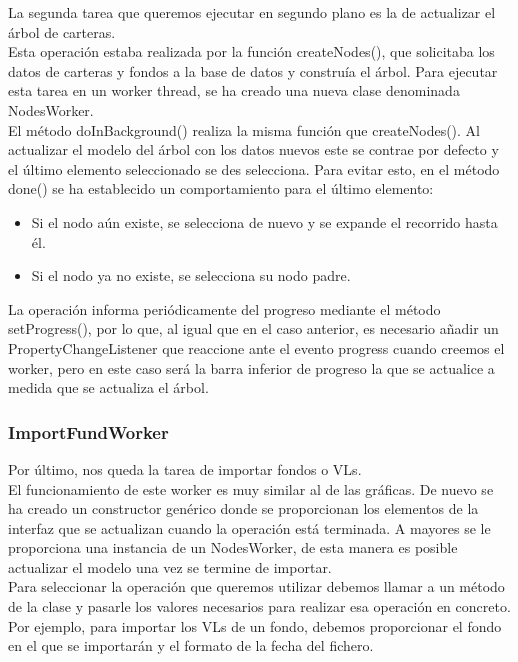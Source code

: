 \documentclass[12pt, a4paper]{article}
\begin{document}
La segunda tarea que queremos ejecutar en segundo plano es la de actualizar el árbol de carteras.\\

Esta operación estaba realizada por la función createNodes(), que solicitaba los datos de carteras y fondos a la base de datos y construía el árbol. Para ejecutar esta tarea en un worker thread, se ha creado una nueva clase denominada NodesWorker.\\

El método doInBackground() realiza la misma función que createNodes(). Al actualizar el modelo del árbol con los datos nuevos este se contrae por defecto y el último elemento seleccionado se des selecciona. Para evitar esto, en el método done() se ha establecido un comportamiento para el último elemento:

\begin{itemize}
	\item Si el nodo aún existe, se selecciona de nuevo y se expande el recorrido hasta él.
	\item Si el nodo ya no existe, se selecciona su nodo padre.
\end{itemize} 

La operación informa periódicamente del progreso mediante el método setProgress(), por lo que, al igual que en el caso anterior, es necesario añadir un PropertyChangeListener que reaccione ante el evento progress cuando creemos el worker, pero en este caso será la barra inferior de progreso la que se actualice a medida que se actualiza el árbol.

\subsubsection{ImportFundWorker}

Por último, nos queda la tarea de importar fondos o \gls{VL}s.\\

El funcionamiento de este worker es muy similar al de las gráficas. De nuevo se ha creado un constructor genérico donde se proporcionan los elementos de la interfaz que se actualizan cuando la operación está terminada. A mayores se le proporciona una instancia de un NodesWorker, de esta manera es posible actualizar el modelo una vez se termine de importar.\\

Para seleccionar la operación que queremos utilizar debemos llamar a un método de la clase y pasarle los valores necesarios para realizar esa operación en concreto. Por ejemplo, para importar los \gls{VL}s de un fondo, debemos proporcionar el fondo en el que se importarán y el formato de la fecha del fichero.\\
\end{document}
